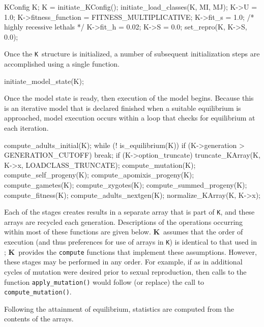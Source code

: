 \documentclass[10pt,twoside,a4paper,fleqn]{report}
\numberwithin{equation}{section}  %
\newcommand{\K}{{\bf K}}
\newcommand{\KK}{\mbox{{\tt K}}}  %
\begin{document}
\begin{C}[gobble=4]
    KConfig K;
    K = initiate_KConfig();
    initiate_load_classes(K, MI, MJ);
    K->U = 1.0;
    K->fitness_function = FITNESS_MULTIPLICATIVE;
    K->fit_s = 1.0;  /* highly recessive lethals */
    K->fit_h = 0.02;
    K->S = 0.0;
    set_repro(K, K->S, 0.0);
\end{C}

Once the \KK\ structure is initialized, a number of subsequent initialization
steps are accomplished using a single function.

\begin{C}[gobble=4]
    initiate_model_state(K);
\end{C}

Once the model state is ready, then execution of the model begins.  Because
this is an iterative model that is declared finished when a suitable
equilibrium is approached, model execution occurs within a loop that checks for
equilibrium at each iteration.

\begin{C}[gobble=4]
    compute_adults_initial(K);
    while (! is_equilibrium(K)) {
        if (K->generation > GENERATION_CUTOFF)
            break;
        if (K->option_truncate)
            truncate_KArray(K, K->x, LOADCLASS_TRUNCATE);
        compute_mutation(K);
        compute_self_progeny(K);
        compute_apomixis_progeny(K);
        compute_gametes(K);
        compute_zygotes(K);
        compute_summed_progeny(K);
        compute_fitness(K);
        compute_adults_nextgen(K);
        normalize_KArray(K, K->x);
    }
\end{C}

Each of the stages creates results in a separate array that is part of \KK, and
these arrays are recycled each generation.  Descriptions of the operations
occurring within most of these functions are given below.  \K\ assumes that the
order of execution (and thus preferences for use of arrays in \KK) is identical
to that used in \citet{Charlesworth:1990:5337}; \K\ provides the
\lstinline{compute} functions that implement these assumptions.  However, these
stages may be performed in any order.  For example, if as in
\citet{Muirhead:1997:5426} additional cycles of mutation were desired prior to
sexual reproduction, then calls to the function \lstinline{apply_mutation()}
would follow (or replace) the call to \lstinline{compute_mutation()}.

Following the attainment of equilibrium, statistics are computed from the
contents of the arrays. 
\end{document}
